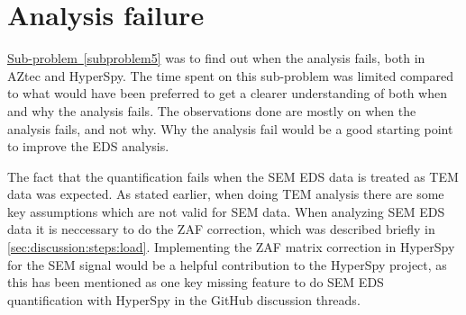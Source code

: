 







%
%




%
%
\section{Analysis failure}
\label{sec:discussion:failure}
\hyperref[subproblem5]{Sub-problem~\ref*{subproblem5}} was to find out when the analysis fails, both in AZtec and HyperSpy.
The time spent on this sub-problem was limited compared to what would have been preferred to get a clearer understanding of both when and why the analysis fails.
The observations done are mostly on when the analysis fails, and not why.
Why the analysis fail would be a good starting point to improve the EDS analysis.

The fact that the quantification fails when the SEM EDS data is treated as TEM data was expected.
As stated earlier, when doing TEM analysis there are some key assumptions which are not valid for SEM data.
When analyzing SEM EDS data it is neccessary to do the ZAF correction, which was described briefly in \cref{sec:discussion:steps:load}.
Implementing the ZAF matrix correction in HyperSpy for the SEM signal would be a helpful contribution to the HyperSpy project, as this has been mentioned as one key missing feature to do SEM EDS quantification with HyperSpy in the GitHub discussion threads.




